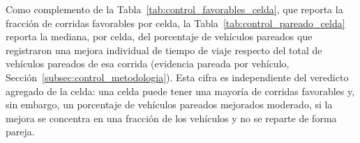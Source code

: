 \begin{table}[htbp]
\renewcommand{\arraystretch}{1.3}
\caption{Corridas favorables (de 10) y medianas de variación porcentual de throughput y
tiempo de sistema, por escenario y campaña de comparación}
\label{tab:control_favorables_celda}
\centering
\footnotesize
{}
\end{table}

Como complemento de la Tabla~\ref{tab:control_favorables_celda}, que reporta la
fracción de corridas favorables por celda, la Tabla~\ref{tab:control_pareado_celda}
reporta la mediana, por celda, del porcentaje de vehículos pareados que registraron una
mejora individual de tiempo de viaje respecto del total de vehículos pareados de esa
corrida (evidencia pareada por vehículo, Sección~\ref{subsec:control_metodologia}). Esta
cifra es independiente del veredicto agregado de la celda: una celda puede tener una
mayoría de corridas favorables y, sin embargo, un porcentaje de vehículos pareados
mejorados moderado, si la mejora se concentra en una fracción de los vehículos y no se
reparte de forma pareja.

